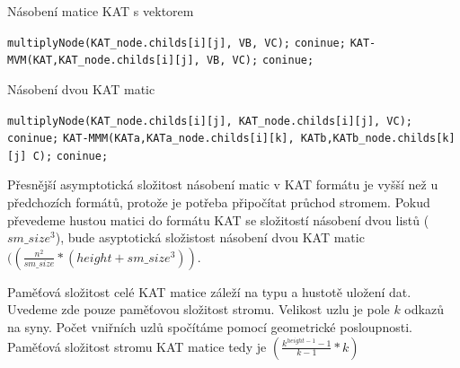 \label{alg:kat-mvm}
\begin{algorithm}[H]
	\caption{Násobení matice KAT s vektorem}\label{kat-mvm}
	\begin{algorithmic}[1]
						\State \texttt{multiplyNode(KAT\_node.childs[i][j], VB, VC);}
						\State \texttt{coninue;}
					\EndIf
						\State \texttt{KAT-MVM(KAT,KAT\_node.childs[i][j], VB, VC);}
						\State \texttt{coninue;}
					\EndIf
				\EndIf
			\EndFor
		\EndFor
		\EndProcedure
	\end{algorithmic}
\end{algorithm}

\label{alg:kat-mmm}
\begin{algorithm}[H]
	\caption{Násobení dvou KAT matic}\label{kat-mmm}
	\begin{algorithmic}[1]
							\State \texttt{multiplyNode(KAT\_node.childs[i][j], KAT\_node.childs[i][j], VC);}
							\State \texttt{coninue;}
						\EndIf
							\State \texttt{KAT-MMM(KATa,KATa\_node.childs[i][k], KATb,KATb\_node.childs[k][j] C);}
							\State \texttt{coninue;}
						\EndIf
					\EndIf
				\EndFor
			\EndFor
		\EndFor
		\EndProcedure
	\end{algorithmic}
\end{algorithm}

Přesnější asymptotická složitost násobení matic v KAT formátu je vyšší než u předchozích formátů, protože je potřeba připočítat průchod stromem. Pokud převedeme hustou matici do formátu KAT se složitostí násobení dvou listů \bigO($sm\_size^3$), bude asyptotická složistost násobení dvou KAT matic \bigO$((\frac{n^2}{sm\_size}*(height+sm\_size^3))$.

Paměťová složitost celé KAT matice záleží na typu a hustotě uložení dat. Uvedeme zde pouze paměťovou složitost stromu. Velikost uzlu je pole $k$ odkazů na syny. Počet vniřních uzlů spočítáme pomocí geometrické posloupnosti. Paměťová složitost stromu KAT matice tedy je \bigO$(\frac{k^{height-1}-1}{k - 1} * k)$
